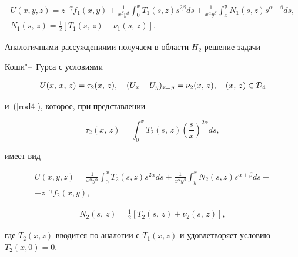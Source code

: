 \begin{gather}

U(x,y,z){=}z^{-\gamma}f_1(x,y){+}\frac{1}{x^\beta

y^\beta}\int _0^xT_1(s,z)s^{2\beta}ds{+}\frac{1}{x^\alpha

y^\beta}\int _x^yN_1(s,z)s^{\alpha{+}\beta}ds, \label{rod14}\\

N_1(s,\,z)=\frac{1}{2}[T_1(s,\,z)-\nu_1(s,\,z)]. \label{rod15}

\end{gather}



Аналогичными рассуждениями получаем в области $H_2$ решение задачи

Коши"--~Гурса с условиями

\begin{gather*}

U(x,\,x,\,z)=\tau_2(x,\,z),\quad

(U_x-U_y)_{x=y}=\nu_2(x,\,z), \quad (x,\,z)\in {\cal D}_4

\end{gather*}

и~(\ref{rod4}), которое, при  представлении

\begin{equation}

\tau_2(x,\,z)=\int _0^xT_2(s,\,z)\left(\frac{s}{x}\right)^{2\alpha}

ds, \label{rod16}

\end{equation}

имеет вид

\begin{multline}

U(x,y,z)=\frac{1}{x^\alpha

y^\alpha}\int _0^xT_2(s,z)s^{2\alpha}ds+  \frac{1}{x^\alpha

y^\beta}\int _y^xN_2(s,z)s^{\alpha{+}\beta}ds+ \\ + z^{-\gamma}f_2(x,y),

\label{rod17}

\end{multline}

\begin{gather}

N_2(s,\,z)=\frac{1}{2}[T_2(s,\,z)+\nu_2(s,\,z)], \label{rod18}

\end{gather}

где $T_2(x, z)$ вводится по  аналогии с $T_1 (x, z)$ и удовлетворяет условию $T_2(x, 0)= 0$.



